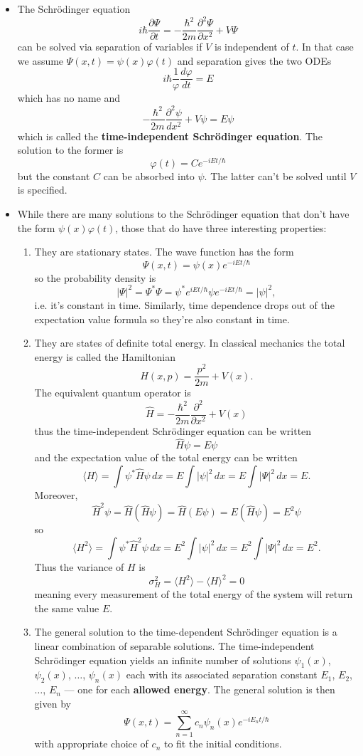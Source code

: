 \documentclass{article}
\newcommand{\ev}[1]{\langle #1 \rangle}
\begin{document}
\begin{itemize}
  \item The Schrödinger equation \[i \hbar \frac{\partial \Psi}{\partial t} = -\frac{\hbar^2}{2 m} \frac{\partial^2 \Psi}{\partial x^2} + V \Psi\] can be solved via separation of variables if $V$ is independent of $t$. In that case we assume $\Psi(x, t) = \psi(x) \varphi(t)$ and separation gives the two ODEs \[i \hbar \frac{1}{\varphi} \frac{d \varphi}{d t} = E\] which has no name and \[-\frac{\hbar^2}{2 m} \frac{\partial^2 \psi}{d x^2} + V \psi = E \psi\] which is called the \textbf{time-independent Schrödinger equation}. The solution to the former is \[\varphi(t) = C e^{-i E t / \hbar}\] but the constant $C$ can be absorbed into $\psi$. The latter can't be solved until $V$ is specified.

  \item While there are many solutions to the Schrödinger equation that don't have the form $\psi(x) \varphi(t)$, those that do have three interesting properties:

        \begin{enumerate}
          \item They are stationary states. The wave function has the form \[\Psi(x, t) = \psi(x) e^{-i E t / \hbar}\] so the probability density is \[|\Psi|^2 = \Psi^* \Psi = \psi^* e^{i E t / \hbar} \psi e^{-i E t / \hbar} = |\psi|^2,\] i.e. it's constant in time. Similarly, time dependence drops out of the expectation value formula so they're also constant in time.

          \item They are states of definite total energy. In classical mechanics the total energy is called the Hamiltonian \[H(x, p) = \frac{p^2}{2 m} + V(x).\] The equivalent quantum operator is \[\hat{H} = -\frac{\hbar^2}{2 m} \frac{\partial^2}{\partial x^2} + V(x)\] thus the time-independent Schrödinger equation can be written \[\hat{H} \psi = E \psi\] and the expectation value of the total energy can be written \[\ev{H} = \int \psi^* \hat{H} \psi \,d x = E \int |\psi|^2 \,d x = E \int |\Psi|^2 \,d x = E.\] Moreover, \[\hat{H}^2 \psi = \hat{H} (\hat{H} \psi) = \hat{H} (E \psi) = E (\hat{H} \psi) = E^2 \psi\] so \[\ev{H^2} = \int \psi^* \hat{H}^2 \psi \,d x = E^2 \int |\psi|^2 \,d x = E^2 \int |\Psi|^2 \,dx = E^2.\] Thus the variance of $H$ is \[\sigma_H^2 = \ev{H^2} - \ev{H}^2 = 0\] meaning every measurement of the total energy of the system will return the same value $E$.

          \item The general solution to the time-dependent Schrödinger equation is a linear combination of separable solutions. The time-independent Schrödinger equation yields an infinite number of solutions $\psi_1(x)$, $\psi_2(x)$, $\ldots$, $\psi_n(x)$ each with its associated separation constant $E_1$, $E_2$, $\ldots$, $E_n$ — one for each \textbf{allowed energy}. The general solution is then given by \[\Psi(x, t) = \sum_{n = 1}^\infty c_n \psi_n(x) e^{-i E_n t / \hbar}\] with appropriate choice of $c_n$ to fit the initial conditions.
        \end{enumerate}


\end{itemize}
\end{document}
